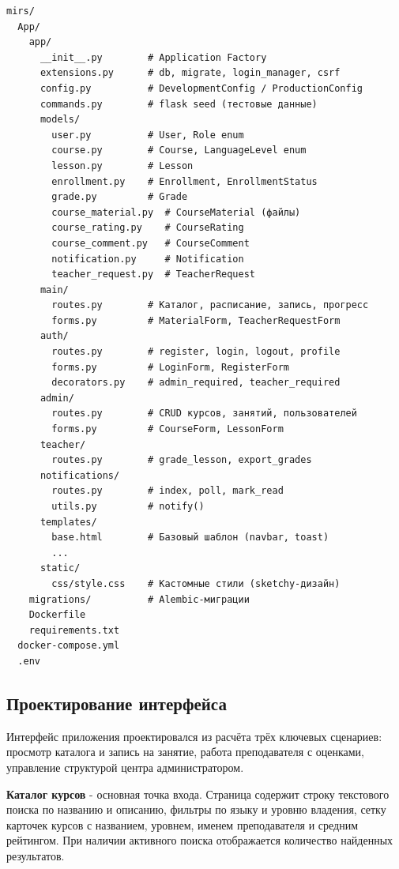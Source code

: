 \begin{lstlisting}[caption={Структура проекта LangCenter}, label={lst:structure}]
mirs/
  App/
    app/
      __init__.py        # Application Factory
      extensions.py      # db, migrate, login_manager, csrf
      config.py          # DevelopmentConfig / ProductionConfig
      commands.py        # flask seed (тестовые данные)
      models/
        user.py          # User, Role enum
        course.py        # Course, LanguageLevel enum
        lesson.py        # Lesson
        enrollment.py    # Enrollment, EnrollmentStatus
        grade.py         # Grade
        course_material.py  # CourseMaterial (файлы)
        course_rating.py    # CourseRating
        course_comment.py   # CourseComment
        notification.py     # Notification
        teacher_request.py  # TeacherRequest
      main/
        routes.py        # Каталог, расписание, запись, прогресс
        forms.py         # MaterialForm, TeacherRequestForm
      auth/
        routes.py        # register, login, logout, profile
        forms.py         # LoginForm, RegisterForm
        decorators.py    # admin_required, teacher_required
      admin/
        routes.py        # CRUD курсов, занятий, пользователей
        forms.py         # CourseForm, LessonForm
      teacher/
        routes.py        # grade_lesson, export_grades
      notifications/
        routes.py        # index, poll, mark_read
        utils.py         # notify()
      templates/
        base.html        # Базовый шаблон (navbar, toast)
        ...
      static/
        css/style.css    # Кастомные стили (sketchy-дизайн)
    migrations/          # Alembic-миграции
    Dockerfile
    requirements.txt
  docker-compose.yml
  .env
\end{lstlisting}

\subsection{Проектирование интерфейса}

Интерфейс приложения проектировался из расчёта трёх ключевых сценариев:
просмотр каталога и запись на занятие, работа преподавателя с оценками,
управление структурой центра администратором.

\textbf{Каталог курсов} - основная точка входа. Страница содержит строку
текстового поиска по названию и описанию, фильтры по языку и уровню владения,
сетку карточек курсов с названием, уровнем, именем преподавателя и средним
рейтингом. При наличии активного поиска отображается количество найденных
результатов.

